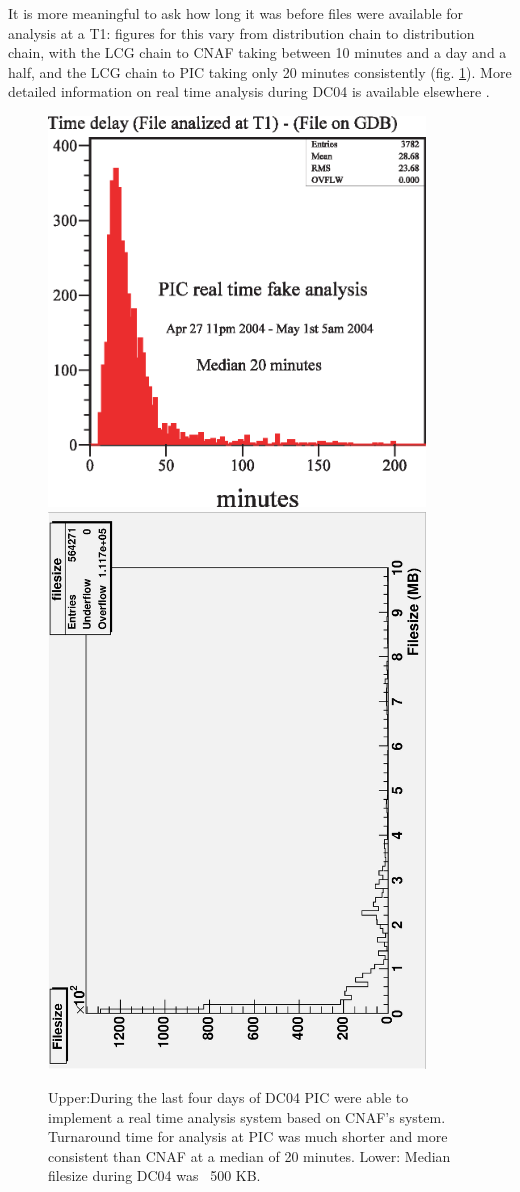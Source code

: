 \documentclass{cmspaper}
\begin{document}
It is more meaningful to ask how long it was before files were
available for analysis at a T1: figures for this vary from
distribution chain to distribution chain, with the LCG chain to CNAF
taking between 10 minutes and a day and a half, and the LCG chain to
PIC taking only 20 minutes consistently (fig. \ref{fig:PIC-RTA}). More
detailed information on real time analysis during DC04 is available
elsewhere \cite{rtadoc}.

\begin{figure}[tbp]
\centering
\includegraphics[width=10cm]{PIC-RTA.eps}
\includegraphics[width=10cm, angle=-90]{filesizes.eps}
\label{fig:PIC-RTA}
\caption{Upper:During the last four days of DC04 PIC were able to implement
a real time analysis system based on CNAF's system. Turnaround time
for analysis at PIC was much shorter and more consistent than CNAF at
a median of 20 minutes. Lower: Median filesize during DC04 was ~500 KB.}
\end{figure} 
\end{document}
